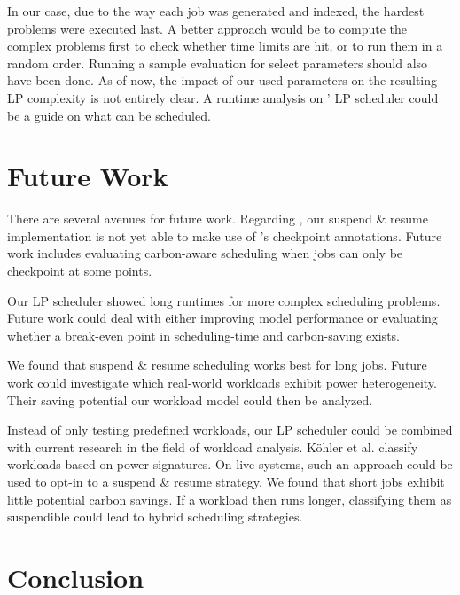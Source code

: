 In our case, due to the way each job was generated and indexed, the hardest problems were executed last. 
A better approach would be to compute the complex problems first to check whether time limits are hit, or to run them in a random order.
Running a sample evaluation for select parameters should also have been done.
As of now, the impact of our used parameters on the resulting LP complexity is not entirely clear.
A runtime analysis on \programname{}' LP scheduler could be a guide on what can be scheduled.

\section{Future Work} \label{sec:future_work}

There are several avenues for future work.
Regarding \programname{}, our suspend \& resume implementation is not yet able to make use of \modelname{}'s checkpoint annotations. Future work includes evaluating carbon-aware scheduling when jobs can only be checkpoint at some points.

Our LP scheduler showed long runtimes for more complex scheduling problems.
Future work could deal with either improving model performance  or evaluating whether a break-even point in scheduling-time and carbon-saving exists.

We found that suspend \& resume scheduling works best for long jobs.
Future work could investigate which real-world workloads exhibit power heterogeneity.
Their saving potential our workload model could then be analyzed.

Instead of only testing predefined workloads, our LP scheduler could be combined with current research in the field of workload analysis. 
Köhler et al. \cite{kohler_recognizing_2021} classify workloads based on power signatures. 
On live systems, such an approach could be used to opt-in to a suspend \& resume strategy. 
We found that short jobs exhibit little potential carbon savings. 
If a workload then runs longer, classifying them as suspendible could lead to hybrid scheduling strategies.  

\section{Conclusion}
